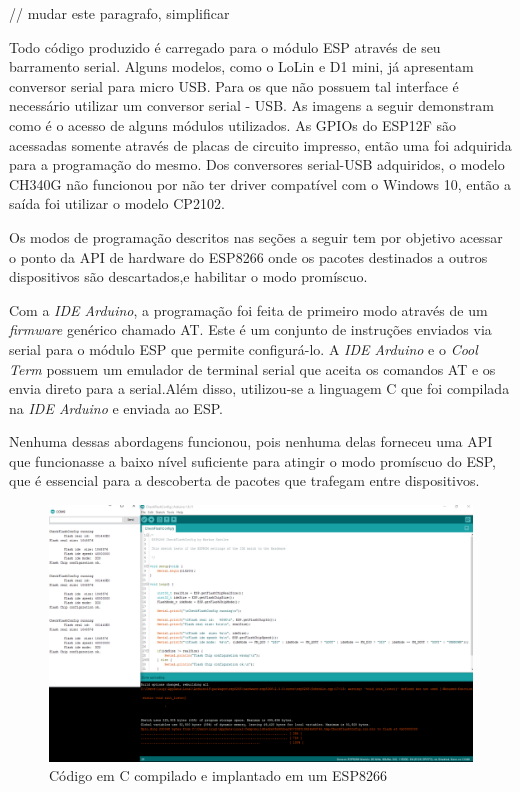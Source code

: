 // mudar este paragrafo, simplificar

Todo código produzido é carregado para o módulo ESP através de seu barramento
serial. Alguns modelos, como o LoLin e D1 mini, já apresentam conversor serial
para micro USB. Para os que não possuem tal interface é necessário utilizar um
conversor serial - USB. As imagens a seguir demonstram como é o acesso de alguns
módulos utilizados. As GPIOs do ESP12F são acessadas somente através de placas
de circuito impresso, então uma foi adquirida para a programação do mesmo. Dos
conversores serial-USB adquiridos, o modelo CH340G não funcionou por não ter
driver compatível com o Windows 10, então a saída foi utilizar o modelo CP2102.


Os modos de programação descritos nas seções a seguir tem por objetivo acessar o
ponto da API de hardware do ESP8266 onde os pacotes destinados a outros
dispositivos são descartados,e habilitar o modo promíscuo.

Com a \emph{IDE Arduino}, a programação foi feita de primeiro modo através de um
\emph{firmware} genérico
chamado AT. Este é um conjunto de instruções enviados via serial para o módulo
ESP que permite configurá-lo. A \emph{IDE Arduino} e o \emph{Cool Term} possuem um emulador de
terminal serial que aceita os comandos AT e os envia direto para a serial.Além
disso, utilizou-se a linguagem C que foi compilada na \emph{IDE Arduino} e enviada ao
ESP.

Nenhuma dessas abordagens funcionou, pois nenhuma delas forneceu uma API que
funcionasse a baixo nível suficiente para atingir o modo promíscuo do ESP, que é
essencial para a descoberta de pacotes que trafegam entre dispositivos.

\begin{figure}[htb]
	\caption{\label{fig:esp-arduino}Código em C compilado e implantado em um ESP8266}
	\begin{center}
		\includegraphics[width=1\textwidth]{040-plataformas/esp-dev/arduino-ide.png}
	\end{center}
\end{figure}


